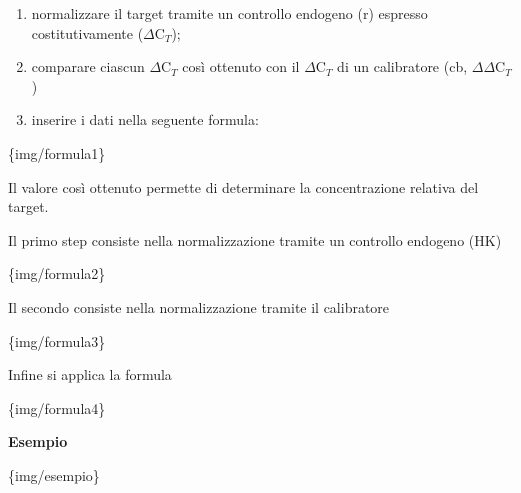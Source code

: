 \documentclass[]{article}
\begin{document}
\begin{enumerate}
\def\labelenumi{\arabic{enumi}.}
\itemsep1pt\parskip0pt
\item
  normalizzare il target tramite un controllo endogeno (r) espresso
  costitutivamente (\(\Delta\)C\(_T\));
\item
  comparare ciascun \(\Delta\)C\(_T\) così ottenuto con il
  \(\Delta\)C\(_T\) di un calibratore (cb, \(\Delta\)\(\Delta\)C\(_T\))
\item
  inserire i dati nella seguente formula:
\end{enumerate}

\{img/formula1\}

Il valore così ottenuto permette di determinare la concentrazione
relativa del target.

Il primo step consiste nella normalizzazione tramite un controllo
endogeno (HK)

\{img/formula2\}

Il secondo consiste nella normalizzazione tramite il calibratore

\{img/formula3\}

Infine si applica la formula

\{img/formula4\}

\textbf{Esempio}

\{img/esempio\}
\end{document}
